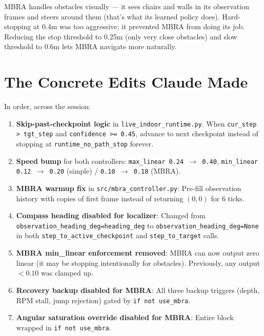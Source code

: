 \documentclass[11pt]{article}
\begin{document}
MBRA handles obstacles visually --- it sees chairs and walls in its observation frames and steers around them (that's what its learned policy does). Hard-stopping at 0.4m was too aggressive; it prevented MBRA from doing its job. Reducing the stop threshold to 0.25m (only very close obstacles) and slow threshold to 0.6m lets MBRA navigate more naturally.


\section{The Concrete Edits Claude Made}

In order, across the session:

\begin{enumerate}
\item \textbf{Skip-past-checkpoint logic} in \texttt{live\_indoor\_runtime.py}. When \texttt{cur\_step > tgt\_step} and \texttt{confidence >= 0.45}, advance to next checkpoint instead of stopping at \texttt{runtime\_no\_path\_stop} forever.

\item \textbf{Speed bump} for both controllers: \texttt{max\_linear 0.24 $\to$ 0.40}, \texttt{min\_linear 0.12 $\to$ 0.20} (simple) / \texttt{0.10 $\to$ 0.18} (MBRA).

\item \textbf{MBRA warmup fix} in \texttt{src/mbra\_controller.py}: Pre-fill observation history with copies of first frame instead of returning $(0, 0)$ for 6 ticks.

\item \textbf{Compass heading disabled for localizer}: Changed from \texttt{observation\_heading\_deg=heading\_deg} to \texttt{observation\_heading\_deg=None} in both \texttt{step\_to\_active\_checkpoint} and \texttt{step\_to\_target} calls.

\item \textbf{MBRA min\_linear enforcement removed}: MBRA can now output zero linear (it may be stopping intentionally for obstacles). Previously, any output $< 0.10$ was clamped up.

\item \textbf{Recovery backup disabled for MBRA}: All three backup triggers (depth, RPM stall, jump rejection) gated by \texttt{if not use\_mbra}.

\item \textbf{Angular saturation override disabled for MBRA}: Entire block wrapped in \texttt{if not use\_mbra}.


\end{enumerate}
\end{document}
